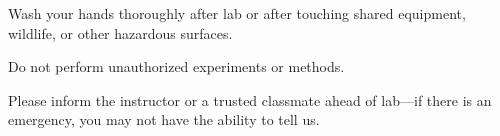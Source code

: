 \documentclass{tufte-handout}
\begin{document}
\begin{fullwidth}
 Wash your hands thoroughly after lab or after touching shared equipment, wildlife, or other hazardous surfaces.

 Do not perform unauthorized experiments or methods.


 Please inform the instructor or a trusted classmate ahead of lab---if there is an emergency, you may not have the ability to tell us.

\end{fullwidth}
\end{document}
